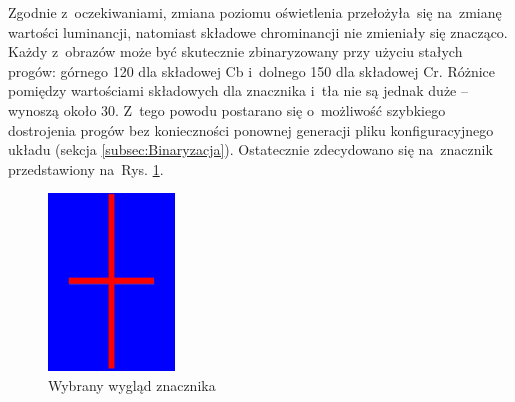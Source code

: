 Zgodnie z~oczekiwaniami, zmiana poziomu oświetlenia przełożyła~się na~zmianę wartości luminancji, natomiast składowe chrominancji nie zmieniały się znacząco. Każdy z~obrazów może być skutecznie zbinaryzowany przy użyciu stałych progów: górnego 120 dla składowej Cb i~dolnego 150 dla składowej Cr. Różnice pomiędzy wartościami składowych dla znacznika i~tła nie są jednak duże -- wynoszą około 30. Z~tego powodu postarano się o~możliwość szybkiego dostrojenia progów bez konieczności ponownej generacji pliku konfiguracyjnego układu (sekcja \ref{subsec:Binaryzacja}). Ostatecznie zdecydowano się na~znacznik przedstawiony na~Rys. \ref{fig:znacznik}.
\begin{figure}[h]
	\centering
	\includegraphics[width=0.3\textwidth]{znacznik.jpg}
	\caption{Wybrany wygląd znacznika}
	\label{fig:znacznik}
\end{figure}

\iffalse %
